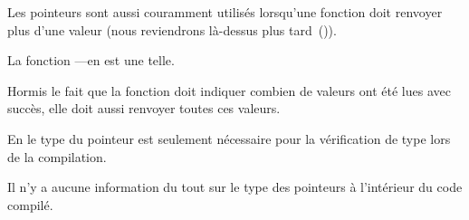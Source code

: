 Les pointeurs sont aussi couramment utilisés lorsqu'une fonction doit renvoyer plus
d'une valeur (nous reviendrons là-dessus plus tard~()).

La fonction ---en est une telle.

Hormis le fait que la fonction doit indiquer combien de valeurs ont été lues avec
succès, elle doit aussi renvoyer toutes ces valeurs.

En \CCpp le type du pointeur est seulement nécessaire pour la vérification de type
lors de la compilation.

Il n'y a aucune information du tout sur le type des pointeurs à l'intérieur du code compilé.





